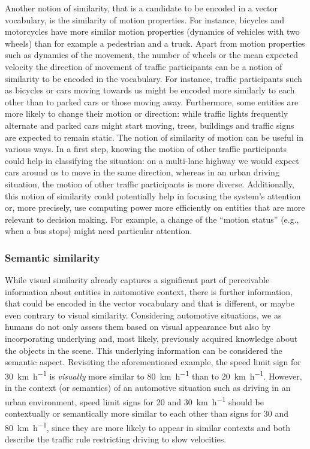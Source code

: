 Another notion of similarity, that is a candidate to be encoded in a vector vocabulary, is the similarity of motion properties.
For instance, bicycles and motorcycles have more similar motion properties (dynamics of vehicles with two wheels) than for example a pedestrian and a truck.
Apart from motion properties such as dynamics of the movement, the number of wheels or the mean expected velocity the direction of movement of traffic participants can be a notion of similarity to be encoded in the vocabulary.
For instance, traffic participants such as bicycles or cars moving towards us might be encoded more similarly to each other than to parked cars or those moving away.
Furthermore, some entities are more likely to change their motion or direction: while traffic lights frequently alternate and parked cars might start moving, trees, buildings and traffic signs are expected to remain static. 
The notion of similarity of motion can be useful in various ways.
In a first step, knowing the motion of other traffic participants could help in classifying the situation: on a multi-lane highway we would expect cars around us to move in the same direction, whereas in an urban driving situation, the motion of other traffic participants is more diverse. 
Additionally, this notion of similarity could potentially help in focusing the system's attention or, more precisely, use computing power more efficiently on entities that are more relevant to decision making.
For example, a change of the \enquote{motion status} (e.g., when a bus stops) might need particular attention.

\subsubsection{Semantic similarity}%
\label{ssubsec:semantic_similarity}

While visual similarity already captures a significant part of perceivable information about entities in automotive context, there is further information, that could be encoded in the vector vocabulary and that is different, or maybe even contrary to visual similarity. 
Considering automotive situations, we as humans do not only assess them based on visual appearance but also by incorporating underlying and, most likely, previously acquired knowledge about the objects in the scene.
This underlying information can be considered the semantic aspect.
Revisiting the aforementioned example, the speed limit sign for \SI[per-mode=symbol]{30}{\kilo\meter\per\hour} is \emph{visually} more similar to \SI[per-mode=symbol]{80}{\kilo\meter\per\hour} than to \SI[per-mode=symbol]{20}{\kilo\meter\per\hour}.
However, in the context (or semantics) of an automotive situation such as driving in an urban environment, speed limit signs for \num{20} and \SI[per-mode=symbol]{30}{\kilo\meter\per\hour} should be contextually or semantically more similar to each other than signs for \num{30} and \SI[per-mode=symbol]{80}{\kilo\meter\per\hour}, since they are more likely to appear in similar contexts and both describe the traffic rule restricting driving to slow velocities.

